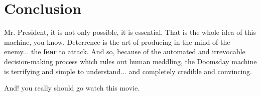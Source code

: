 \section{Conclusion}\label{sec:90-conclude}%
Mr. President, it is not only possible, it is essential. That is the whole idea of this machine, you know. Deterrence is the art of producing in the mind of the enemy... the \textbf{fear} to attack. And so, because of the automated and irrevocable decision-making process which rules out human meddling, the Doomsday machine is terrifying and simple to understand... and completely credible and convincing.

And! you really should go watch this movie.
